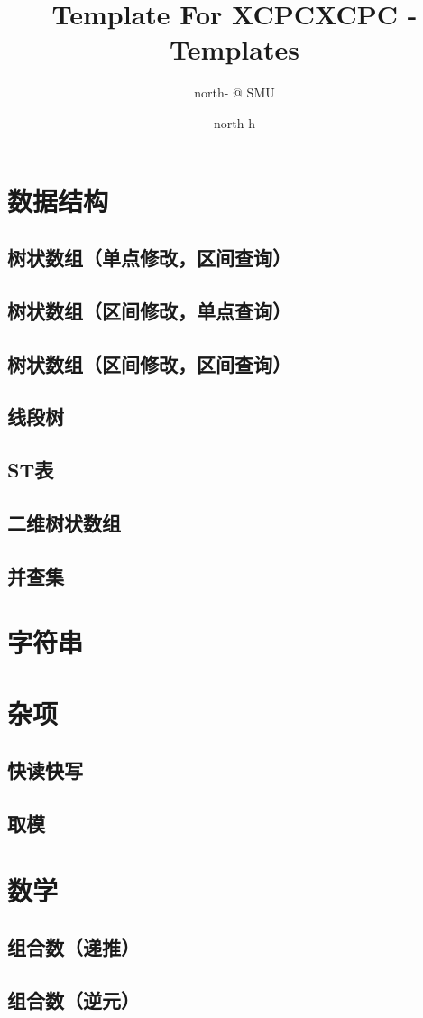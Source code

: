 \documentclass[10pt,a4paper]{article}
\title{Template For XCPC}
\author{north- @ SMU}
\begin{document}
\title{XCPC - Templates}
\author {north-h}
\date{}
\maketitle
\tableofcontents
\newpage
\section{数据结构}
\subsection{树状数组（单点修改，区间查询）}

\subsection{树状数组（区间修改，单点查询）}

\subsection{树状数组（区间修改，区间查询）}

\subsection{线段树}

\subsection{ST表}

\subsection{二维树状数组}

\subsection{并查集}

\section{字符串}
\section{杂项}
\subsection{快读快写}

\subsection{取模}

\section{数学}
\subsection{组合数（递推）}

\subsection{组合数（逆元）}

\end{document}
